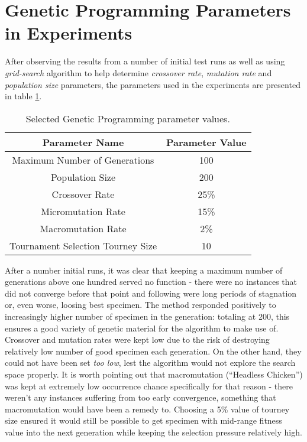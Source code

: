 \section{Genetic Programming Parameters in Experiments}
After observing the results from a number of initial test runs as well as using \textit{grid-search} algorithm to help determine \textit{crossover rate}, \textit{mutation rate} and \textit{population size} parameters, the parameters used in the experiments are presented in table \ref{table:x selectedgpparameters}.

\begin{table} [h]
    \centering
    \begin{tabular} {c c}
        \hline \hline
        Parameter Name & Parameter Value \\
        \hline
        Maximum Number of Generations & 100 \\
        Population Size & 200 \\
        Crossover Rate & 25\% \\
        Micromutation Rate & 15\% \\
        Macromutation Rate & 2\% \\
        Tournament Selection Tourney Size & 10 \\
    \end{tabular}
    \caption{Selected Genetic Programming parameter values.}
    \label{table:x selectedgpparameters}
\end{table}

After a number initial runs, it was clear that keeping a maximum number of generations above one hundred served no function - there were no instances that did not converge before that point and following were long periods of stagnation or, even worse, loosing best specimen. The method responded positively to increasingly higher number of specimen in the generation: totaling at 200, this ensures a good variety of genetic material for the algorithm to make use of. Crossover and mutation rates were kept low due to the risk of destroying relatively low number of good specimen each generation. On the other hand, they could not have been set \textit{too low}, lest the algorithm would not explore the search space properly. It is worth pointing out that macromutation (``Headless Chicken'') was kept at extremely low occurrence chance specifically for that reason - there weren't any instances suffering from too early convergence, something that macromutation would have been a remedy to. Choosing a 5\% value of tourney size ensured it would still be possible to get specimen with mid-range fitness value into the next generation while keeping the selection pressure relatively high.

